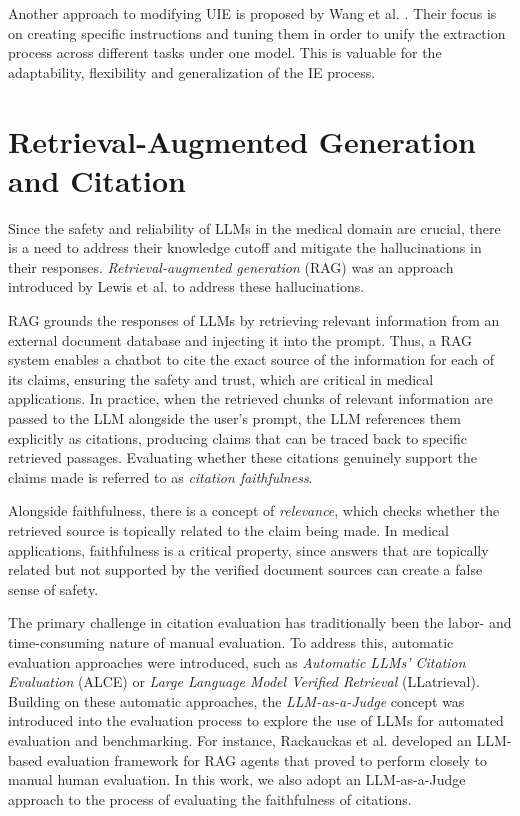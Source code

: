 Another approach to modifying UIE is proposed by Wang et al. \cite{wangInstructUIEMultitaskInstruction2023}. Their focus is on creating specific instructions and tuning them in order to unify the extraction process across different tasks under one model. This is valuable for the adaptability, flexibility and generalization of the IE process.

\section{Retrieval-Augmented Generation and Citation}

Since the safety and reliability of LLMs in the medical domain are crucial, there is a need to address their knowledge cutoff and mitigate the hallucinations in their responses. \textit{Retrieval-augmented generation} (RAG) was an approach introduced by Lewis et al.\cite{lewisRetrievalAugmentedGenerationKnowledgeIntensive2021} to address these hallucinations.

RAG grounds the responses of LLMs by retrieving relevant information from an external document database and injecting it into the prompt. Thus, a RAG system enables a chatbot to cite the exact source of the information for each of its claims, ensuring the safety and trust, which are critical in medical applications.
In practice, when the retrieved chunks of relevant information are passed to the LLM alongside the user's prompt, the LLM references them explicitly as citations, producing claims that can be traced back to specific retrieved passages.
Evaluating whether these citations genuinely support the claims made is referred to as \textit{citation faithfulness}.

Alongside faithfulness, there is a concept of \textit{relevance}, which checks whether the retrieved source is topically related to the claim being made.
In medical applications, faithfulness is a critical property, since answers that are topically related but not supported by the verified document sources can create a false sense of safety.

The primary challenge in citation evaluation has traditionally been the labor- and time-consuming nature of manual evaluation. 
To address this, automatic evaluation approaches were introduced, such as \textit{Automatic LLMs' Citation Evaluation} (ALCE)\cite{gaoEnablingLargeLanguage2023} or \textit{Large Language Model Verified Retrieval} (LLatrieval)\cite{liLLatrievalLLMVerifiedRetrieval2024}.
Building on these automatic approaches, the \textit{LLM-as-a-Judge} concept was introduced into the evaluation process to explore the use of LLMs for automated evaluation and benchmarking. 
For instance, Rackauckas et al. developed an LLM-based evaluation framework for RAG agents that proved to perform closely to manual human evaluation\cite{rackauckasEvaluatingRAGFusionRAGElo2024}.
In this work, we also adopt an LLM-as-a-Judge approach to the process of evaluating the faithfulness of citations.

